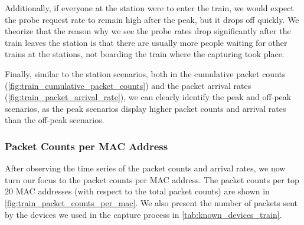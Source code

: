\documentclass[sigconf,nonacm]{acmart}
\begin{document}
Additionally, if everyone at the station were to enter the train, we would expect the probe request rate to remain high after the peak, but it drops off quickly. We theorize that the reason why we see the probe rates drop significantly after the train leaves the station is that there are usually more people waiting for other trains at the stations, not boarding the train where the capturing took place.

Finally, similar to the station scenarios, both in the cumulative packet counts (\cref{fig:train_cumulative_packet_counts}) and the packet arrival rates (\cref{fig:train_packet_arrival_rate}), we can clearly identify the peak and off-peak scenarios, as the peak scenarios display higher packet counts and arrival rates than the off-peak scenarios.

\subsubsection{Packet Counts per MAC Address}
\label{sec:part-1/train/packet-counts-per-mac}
After observing the time series of the packet counts and arrival rates, we now turn our focus to the packet counts per MAC address. The packet counts per top 20 MAC addresses (with respect to the total packet counts) are shown in \cref{fig:train_packet_counts_per_mac}. We also present the number of packets sent by the devices we used in the capture process in \cref{tab:known_devices_train}.

\begin{table}[ht]
    \centering
    \caption{Packet counts of known devices in train scenarios.}
    \label{tab:known_devices_train}
\end{table}
\end{document}
